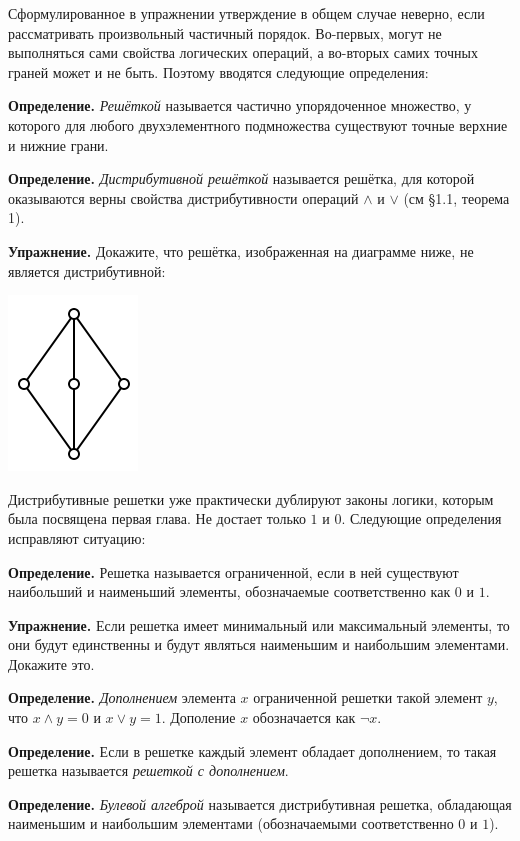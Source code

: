Сформулированное в упражнении утверждение в общем случае неверно, если рассматривать произвольный частичный порядок. Во-первых, могут не выполняться сами свойства логических операций, а во-вторых самих точных граней может и не быть. Поэтому вводятся следующие определения:

{\bfseries Определение.} {\slshape Решёткой} называется частично упорядоченное множество, у которого для любого двухэлементного подмножества существуют точные верхние и нижние грани.

{\bfseries Определение.} {\slshape Дистрибутивной решёткой} называется решётка, для которой оказываются верны свойства дистрибутивности операций $\wedge$ и $\vee$ (см §1.1, теорема 1).

{\bfseries Упражнение.} Докажите, что решётка, изображенная на диаграмме ниже, не является дистрибутивной:

\includegraphics{lattice.png}

Дистрибутивные решетки уже практически дублируют законы логики, которым была посвящена первая глава. Не достает только $1$ и $0$. Следующие определения исправляют ситуацию:

{\bfseries Определение.} Решетка называется ограниченной, если в ней существуют наибольший и наименьший элементы, обозначаемые соответственно как $0$ и $1$.

{\bfseries Упражнение.} Если решетка имеет минимальный или максимальный элементы, то они будут единственны и будут являться наименьшим и наибольшим элементами. Докажите это.

{\bfseries Определение.} {\slshape Дополнением} элемента $x$ ограниченной решетки такой элемент $y$, что $x\wedge y = 0$ и $x \vee y = 1$. Дополение $x$ обозначается как $\neg x$.

{\bfseries Определение.} Если в решетке каждый элемент обладает дополнением, то такая решетка называется {\slshape решеткой с дополнением}.

{\bfseries Определение.} {\slshape Булевой алгеброй} называется дистрибутивная решетка, обладающая наименьшим и наибольшим элементами (обозначаемыми соответственно $0$ и $1$).

